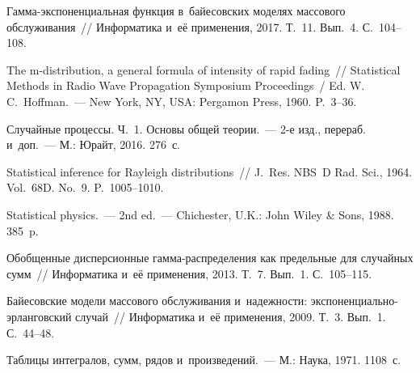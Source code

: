 \begin{multicols}{2}
{{\begin{thebibliography}{99}
Гам\-ма-экс\-по\-нен\-ци\-аль\-ная функция в~байесовских моделях массового обслуживания~// 
Информатика и~её применения, 2017. Т.~11. Вып.~4. С.~104--108.

The m-distribution, a general formula of intensity of rapid fading~// 
Statistical Methods in Radio Wave Propagation 
Symposium Proceedings~/ Ed. W.\,C.~Hoffman.~--- 
New York, NY, USA: Pergamon Press, 1960. P.~3--36.

Случайные процессы. Ч.~1. Основы общей теории.~--- 2-е изд., перераб. и~доп.~--- 
М.: Юрайт, 2016. 276~с.

Statistical inference for Rayleigh distributions~// 
J.~Res. NBS~D Rad. Sci., 1964. 
Vol.~68D. No.~9. P.~1005--1010.

Statistical physics.~--- 2nd ed.~--- Chichester, U.K.: John Wiley \& Sons, 1988. 385~p.

Обобщенные дисперсионные гам\-ма-рас\-пре\-де\-ле\-ния как предельные для случайных сумм~// 
Информатика и~её применения, 2013. Т.~7. Вып.~1. С.~105--115.

Байесовские модели массового обслуживания и~надежности: 
экс\-по\-нен\-ци\-аль\-но-эр\-лан\-гов\-ский случай~// Информатика и~её 
применения, 2009. Т.~3. Вып.~1. С.~44--48.

Таблицы интегралов, сумм, рядов и~произведений.~--- М.: Наука, 1971. 1108~с.
 \end{thebibliography}

 }
 }

\end{multicols}

